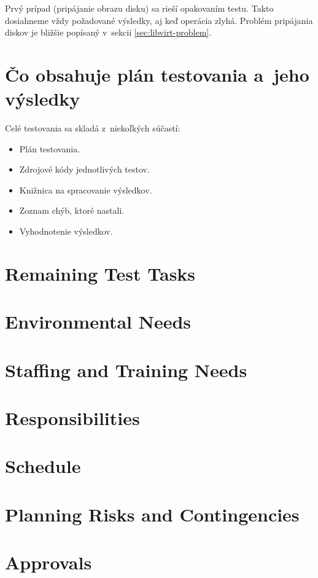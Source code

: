 Prvý prípad (pripájanie obrazu disku) sa rieší opakovaním testu. Takto
dosiahneme vždy požadované výsledky, aj keď operácia zlyhá. Problém pripájania
diskov je bližšie popísaný v~sekcii \ref{sec:libvirt-problem}.

\section{Čo obsahuje plán testovania a~jeho výsledky}

Celé testovania sa skladá z~niekoľkých súčastí:

\begin{itemize}
    \item Plán testovania.
    \item Zdrojové kódy jednotlivých testov.
    \item Knižnica na spracovanie výsledkov.
    \item Zoznam chýb, ktoré nastali.
    \item Vyhodnotenie výsledkov.
\end{itemize}

\section{Remaining Test Tasks}
\section{Environmental Needs}
\section{Staffing and Training Needs}
\section{Responsibilities}
\section{Schedule}
\section{Planning Risks and Contingencies}
\section{Approvals}
